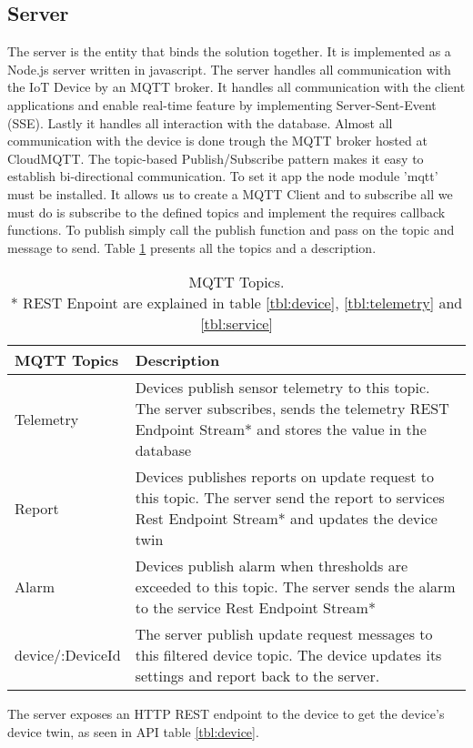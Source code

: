 \subsection{Server}
The server is the entity that binds the solution together. It is implemented as a Node.js server written in javascript.  The server handles all communication with the IoT Device by an MQTT broker. It handles all communication with the client applications and enable real-time feature by implementing Server-Sent-Event (SSE). Lastly it handles all interaction with the database.   
Almost all communication with the device is done trough the MQTT broker hosted at CloudMQTT. The topic-based Publish/Subscribe pattern makes it easy to establish bi-directional communication. To set it app the node module 'mqtt' must be installed. It allows us to create a MQTT Client and to subscribe all we must do is subscribe to the defined topics and implement the requires callback functions. To publish simply call the publish function and pass on the topic and message to send. Table \ref{tbl:topics} presents all the topics and a description.

\begin{table}[H]
    \centering
    \begin{tabular}{|l|p{10cm}|}
    \hline
    \textbf{MQTT Topics}    & \textbf{Description} \\ \hline
    Telemetry & Devices publish sensor telemetry to this topic. The server subscribes, sends the telemetry REST Endpoint Stream* and stores the value in the database \\ \hline
    Report & Devices publishes reports on update request to this topic. The server send the report to services Rest Endpoint Stream* and updates the device twin \\ \hline
    Alarm & Devices publish alarm when thresholds are exceeded to this topic. The server sends the alarm to the service Rest Endpoint Stream* \\ \hline
    device/:DeviceId & The server publish update request messages to this filtered device topic. The device updates its settings and report back to the server. \\ \hline
    \end{tabular}
    \caption{MQTT Topics.\\ * REST Enpoint are explained in table \ref{tbl:device}, \ref{tbl:telemetry} and \ref{tbl:service}}
    \label{tbl:topics}
\end{table}
The server exposes an HTTP REST endpoint to the device to get the device's device twin, as seen in API table \ref{tbl:device}.

